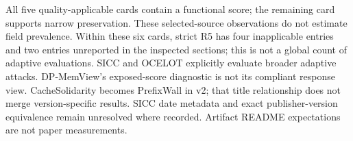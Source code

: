 \begin{table}[t]
All five quality-applicable cards contain a functional score; the remaining card supports narrow preservation. These selected-source observations do not estimate field prevalence. Within these six cards, strict R5 has four inapplicable entries and two entries unreported in the inspected sections; this is not a global count of adaptive evaluations. SICC and OCELOT explicitly evaluate broader adaptive attacks. DP-MemView's exposed-score diagnostic is not its compliant response view. CacheSolidarity becomes PrefixWall in v2; that title relationship does not merge version-specific results. SICC date metadata and exact publisher-version equivalence remain unresolved where recorded. Artifact README expectations are not paper measurements.
\end{table}
